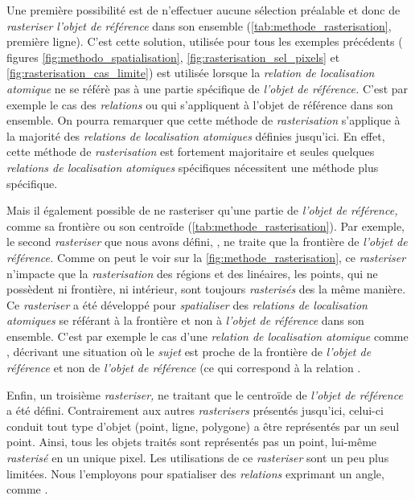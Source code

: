 Une première possibilité est de n'effectuer aucune sélection préalable
et donc de \emph{rasteriser} \emph{l'objet de référence} dans son
ensemble (\autoref{tab:methode_rasterisation}, première ligne). C'est
cette solution, utilisée pour tous les exemples précédents (\ie
figures \ref{fig:methodo_spatialisation},
\ref{fig:rasterisation_sel_pixels} et
\ref{fig:rasterisation_cas_limite}) est utilisée lorsque la
\emph{relation de localisation atomique} ne se référè pas à une partie
spécifique de \emph{l'objet de référence.} C'est par exemple le cas
des \emph{relations}  ou 
qui s'appliquent à l'objet de référence dans son ensemble. On pourra
remarquer que cette méthode de \emph{rasterisation} s'applique à la
majorité des \emph{relations de localisation atomiques} définies
jusqu'ici. En effet, cette méthode de \emph{rasterisation} est
fortement majoritaire et seules quelques \emph{relations de
  localisation atomiques} spécifiques nécessitent une méthode plus
spécifique.

Mais il également possible de ne rasteriser qu'une partie de
\emph{l'objet de référence,} comme sa frontière ou son centroïde
(\autoref{tab:methode_rasterisation}). Par exemple, le second
\emph{rasteriser} que nous avons défini, , ne traite
que la frontière de \emph{l'objet de référence.} Comme on peut le voir
sur la \autoref{fig:methode_rasterisation}, ce \emph{rasteriser}
n'impacte que la \emph{rasterisation} des régions et des linéaires,
les points, qui ne possèdent ni frontière, ni intérieur, sont toujours
\emph{rasterisés} des la même manière. Ce \emph{rasteriser} a été
développé pour \emph{spatialiser} des \emph{relations de localisation
  atomiques} se référant à la frontière et non à \emph{l'objet de
  référence} dans son ensemble. C'est par exemple le cas d'une
\emph{relation de localisation atomique} comme
, décrivant une situation où le
\emph{sujet} est proche de la frontière de \emph{l'objet de référence}
et non de \emph{l'objet de référence} (ce qui correspond à la relation
.

Enfin, un troisième \emph{rasteriser,} ne traitant que le centroïde de
\emph{l'objet de référence} a été défini. Contrairement aux autres
\emph{rasterisers} présentés jusqu'ici, celui-ci conduit tout type
d'objet (\ie point, ligne, polygone) a être représentés par un seul
point. Ainsi, tous les objets traités sont représentés pas un point,
lui-même \emph{rasterisé} en un unique pixel. Les utilisations de ce
\emph{rasteriser} sont un peu plus limitées. Nous l'employons pour
spatialiser des \emph{relations} exprimant un angle, comme
.

